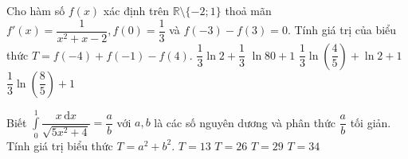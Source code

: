 \begin{ex}%
	Cho hàm số $f(x)$ xác định trên $\mathbb{R}\setminus \{-2;1\} $ thoả mãn $f'(x)=\dfrac{1}{x^2+x-2}, f(0)=\dfrac{1}{3}$ và $f(-3)-f(3)=0$. Tính giá trị của biểu thức $T=f(-4)+f(-1)-f(4)$.
	\choice
	{\True $\dfrac{1}{3}\ln2 +\dfrac{1}{3} $}
	{$\ln80 +1$}
	{$\dfrac{1}{3}\ln\left(\dfrac{4}{5}\right)+\ln2+1$}
	{$\dfrac{1}{3}\ln\left(\dfrac{8}{5}\right)+1$}
\end{ex}

\begin{ex}%
	Biết $\displaystyle\int\limits_0^1 {\dfrac{x\mathrm{\,d}x}{\sqrt{5x^2+4}}}=\dfrac{a}{b}$ với $a,b$ là các số nguyên dương và phân thức $\dfrac{a}{b}$ tối giản. Tính giá trị biểu thức $T=a^2+b^2$.
	\choice
	{$T=13$}
	{\True $T=26$}
	{$T=29$}
	{$T=34$}	
\end{ex}

